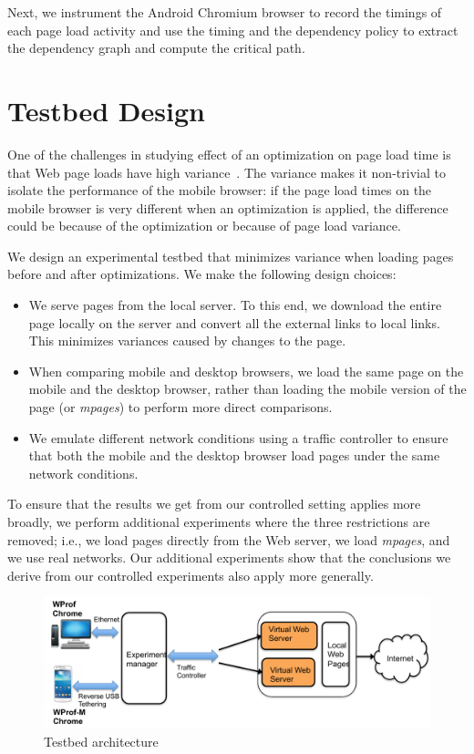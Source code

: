 \noindent Next, we instrument the Android Chromium browser to record the timings of each page load activity and use the timing and the dependency policy to extract the dependency graph and compute the critical path.

\section{Testbed Design} One of the challenges in studying effect of an optimization on page load time is that Web page loads have high variance~\cite{spdy_nsdi}. The variance makes it non-trivial to isolate the performance of the mobile browser: if the page load times on the mobile browser is very different when an optimization is applied, the difference could be because of the optimization or because of page load variance.

\noindent We design an experimental testbed that minimizes variance when loading pages before and after optimizations. We make the following design choices:
 \begin{itemize}
  \item  We serve pages from the local server. To this end, we download the entire page locally on the server and convert all the external links to local links.  This minimizes variances caused by changes to the page. 
   \item When comparing mobile and desktop browsers, we load the same page on the mobile and the desktop browser, rather than loading the mobile version of the page (or {\em mpages}) to perform more direct comparisons.
    \item  We emulate different network conditions using a traffic controller to ensure that both the mobile and the desktop browser load pages under the same network conditions.
    \end{itemize}

\noindent To ensure that the results we get from our controlled setting applies more broadly, we perform additional experiments where the three restrictions are removed; i.e., we load pages directly from the Web server, we load {\em mpages}, and we use real networks. Our additional experiments show that the conclusions we derive from our controlled experiments also apply more generally. \\

 \begin{figure}[!htb]
  \centering
    \includegraphics[width=0.9 \textwidth]{./figures/methodology/architecture.pdf}
  \caption{Testbed architecture}
  \label{fig:architecture}
\end{figure}

